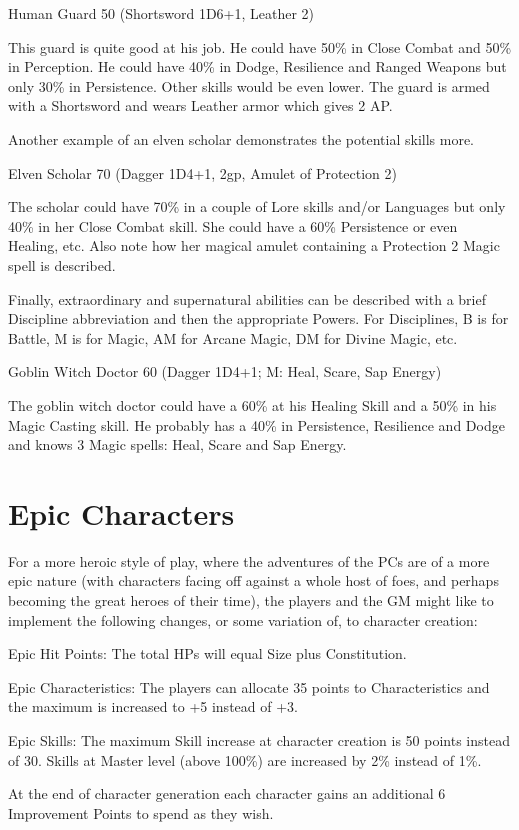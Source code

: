 \begin{rpg-examplebox}	
Human Guard 50 (Shortsword 1D6+1, Leather 2)
\end{rpg-examplebox}

This guard is quite good at his job. He could have 50\% in Close Combat and 50\% in Perception. He could have 40\% in Dodge, Resilience and Ranged Weapons but only 30\% in Persistence. Other skills would be even lower.
The guard is armed with a Shortsword and wears Leather armor which gives 2 AP.

Another example of an elven scholar demonstrates the potential skills more.

\begin{rpg-examplebox}
Elven Scholar 70 (Dagger 1D4+1, 2gp, Amulet of Protection 2)
\end{rpg-examplebox}

The scholar could have 70\% in a couple of Lore skills and/or Languages but only 40\% in her Close Combat skill. She could have a 60\% Persistence or even Healing, etc.
Also note how her magical amulet containing a Protection 2 Magic spell is described.

Finally, extraordinary and supernatural abilities can be described with a brief Discipline abbreviation and then the appropriate Powers. For Disciplines, B is for Battle, M is for Magic, AM for Arcane Magic, DM for Divine Magic, etc.

\begin{rpg-examplebox}
Goblin Witch Doctor 60 (Dagger 1D4+1; M: Heal, Scare, Sap Energy)
\end{rpg-examplebox}

The goblin witch doctor could have a 60\% at his Healing Skill and a 50\% in his Magic Casting skill. He probably has a 40\% in Persistence, Resilience and Dodge and knows 3 Magic spells: Heal, Scare and Sap Energy.


\section{Epic Characters}
For a more heroic style of play, where the adventures of the PCs are of a more epic nature (with characters facing off against a whole host of foes, and perhaps becoming the great heroes of their time), the players and the GM might like to implement the following changes, or some variation of, to character creation:

\begin{rpg-list}
	\item Epic Hit Points: The total HPs will equal Size plus Constitution.
	\item Epic Characteristics: The players can allocate 35 points to Characteristics and the maximum is increased to +5 instead of +3.
	\item Epic Skills: The maximum Skill increase at character creation is 50 points instead of 30. Skills at Master level (above 100\%) are increased by 2\% instead of 1\%.
	\item At the end of character generation each character gains an additional 6 Improvement Points to spend as they wish.
\end{rpg-list}

